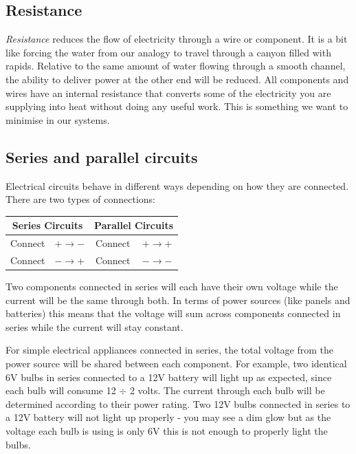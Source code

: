\documentclass{article}
\theoremstyle{definition}
\theoremstyle{definition}
\theoremstyle{remark}
\begin{document}
  \subsection{Resistance} %
  \label{sub:resistance}

    \textit{Resistance} reduces the flow of electricity through a wire or component. It is a bit like forcing the water from our analogy to travel through a canyon filled with rapids. Relative to the same amount of water flowing through a smooth channel, the ability to deliver power at the other end will be reduced. All components and wires have an internal resistance that converts some of the electricity you are supplying into heat without doing any useful work. This is something we want to minimise in our systems. 
  

  \subsection{Series and parallel circuits} %
  \label{sub:series_and_parallel_circuits}

    Electrical circuits behave in different ways depending on how they are connected. There are two types of connections: 
      
      \begin{table}[!ht]
        \centering
        \begin{tabular}{|| c | c | c | c ||}
          \hline
          \multicolumn{2}{|c|}{Series Circuits}  & \multicolumn{2}{|c|}{Parallel Circuits}  \\
          \hline \hline
          Connect & $+ \rightarrow -$ & Connect & $+ \rightarrow +$ \\
          \hline
          Connect & $- \rightarrow +$ & Connect & $- \rightarrow -$ \\
          \hline
        \end{tabular}
        \label{table:two_types_of_connections}
      \end{table}

    Two components connected in series will each have their own voltage while the current will be the same through both. In terms of power sources (like panels and batteries) this means that the voltage will sum across components connected in series while the current will stay constant. 

    For simple electrical appliances connected in series, the total voltage from the power source will be shared between each component. For example, two identical 6V bulbs in series connected to a 12V battery will light up as expected, since each bulb will consume 12 \(\div\) 2 volts. The current through each bulb will be determined according to their power rating. Two 12V bulbs connected in series to a 12V battery will not light up properly - you may see a dim glow but as the voltage each bulb is using is only 6V this is not enough to properly light the bulbs.
\end{document}
